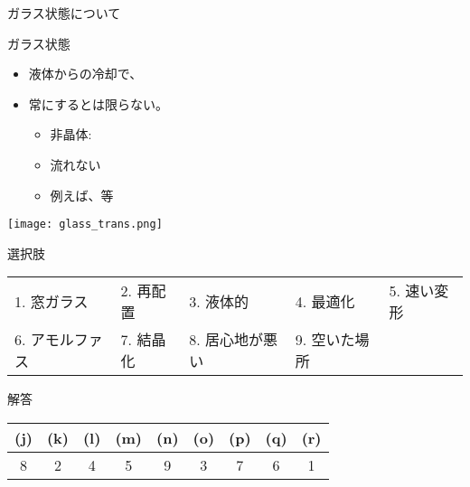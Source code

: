 \documentclass[uplatex,dvipdfmx,a4paper,11pt]{jsarticle}
\begin{document}
\begin{qlist}
\begin{qlist2}
			\qitem ガラス状態について
				\begin{center}
					\begin{minipage}{0.46\textwidth}
						\begin{itembox}[l]{ガラス状態}
							\begin{itemize}
								\item 液体からの冷却で、
								\item 常に\qbox{}するとは限らない。
								\begin{itemize}
									\item 非晶体:\qbox{}
									\item 流れない
									\item 例えば、\qbox{}等
								\end{itemize}
							\end{itemize}
						\end{itembox}
					\end{minipage}
					\begin{minipage}{0.4\textwidth}
						\begin{center}
						\texttt{[image: glass\_trans.png]}
						\end{center}
					\end{minipage}
				\end{center}
		\end{qlist2}

		\begin{itembox}[l]{選択肢}
			\begin{center}
				\begin{tabular}{lllll}
					1. 窓ガラス	&2. 再配置	&3. 液体的	&4. 最適化	&5. 速い変形\\
					6. アモルファス	&7. 結晶化		&8. 居心地が悪い	&9. 空いた場所
				\end{tabular}
			\end{center}
		\end{itembox}
\end{qlist}

\begin{itembox}[l]{解答}
    \begin{center} 
      \begin{tabular}{|c|c|c|c|c|c|c|c|c|} \hline
        (j) & (k) & (l) & (m) & (n) & (o) & (p) & (q) & (r)\\ \hline
         8  &  2 & 4 & 5 & 9 & 3 & 7 & 6 & 1 \\ \hline		
      \end{tabular}
    \end{center}
\end{itembox}
\end{document}
